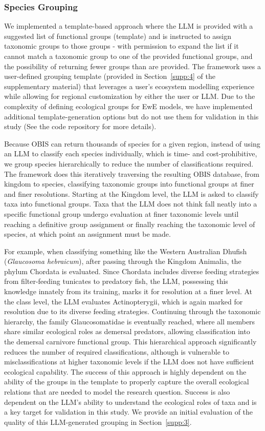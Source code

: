 \subsubsection{Species Grouping}

We implemented a template-based approach where the LLM is provided with a suggested list of functional groups (template) and is instructed to assign taxonomic groups to those groups - with permission to expand the list if it cannot match a taxonomic group to one of the provided functional groups, and the possibility of returning fewer groups than are provided. The framework uses a user-defined grouping template (provided in Section~\ref{supp:4} of the supplementary material) that leverages a user's ecosystem modelling experience while allowing for regional customization by either the user or LLM. Due to the complexity of defining ecological groups for EwE models, we have implemented additional template-generation options but do not use them for validation in this study (See the code repository for more details).

Because OBIS can return thousands of species for a given region, instead of using an LLM to classify each species individually, which is time- and cost-prohibitive, we group species hierarchically to reduce the number of classifications required. The framework does this iteratively traversing the resulting OBIS database, from kingdom to species, classifying taxonomic groups into functional groups at finer and finer resolutions. Starting at the Kingdom level, the LLM is asked to classify taxa into functional groups. Taxa that the LLM does not think fall neatly into a specific functional group undergo evaluation at finer taxonomic levels until reaching a definitive group assignment or finally reaching the taxonomic level of species, at which point an assignment must be made. 

For example, when classifying something like the Western Australian Dhufish (\textit{Glaucosoma hebraicum}), after passing through the Kingdom Animalia, the phylum Chordata is evaluated. Since Chordata includes diverse feeding strategies from filter-feeding tunicates to predatory fish, the LLM, possessing this knowledge innately from its training, marks it for resolution at a finer level. At the class level, the LLM evaluates Actinopterygii, which is again marked for resolution due to its diverse feeding strategies. Continuing through the taxonomic hierarchy, the family Glaucosomatidae is eventually reached, where all members share similar ecological roles as demersal predators, allowing classification into the demersal carnivore functional group. This hierarchical approach significantly reduces the number of required classifications, although is vulnerable to misclassifications at higher taxonomic levels if the LLM does not have sufficient ecological capability. The success of this approach is highly dependent on the ability of the groups in the template to properly capture the overall ecological relations that are needed to model the research question. Success is also dependent on the LLM's ability to understand the ecological roles of taxa and is a key target for validation in this study. We provide an initial evaluation of the quality of this LLM-generated grouping in Section~\ref{supp:3}.


